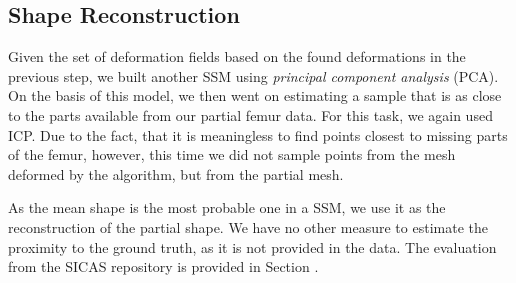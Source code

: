 \todoMissing{}


\subsection{Shape Reconstruction}
\label{subsec:recon}

Given the set of deformation fields based on the found deformations in the previous step, we built another SSM using \emph{principal component analysis} (PCA).
On the basis of this model, we then went on estimating a sample that is as close to the parts available from our partial femur data.
For this task, we again used ICP.
Due to the fact, that it is meaningless to find points closest to missing parts of the femur, however, this time we did not sample points from the mesh deformed by the algorithm, but from the partial mesh.

As the mean shape is the most probable one in a SSM, we use it as the reconstruction of the partial shape.
We have no other measure to estimate the proximity to the ground truth, as it is not provided in the data.
The evaluation from the SICAS repository \todoCitation{} is provided in Section .

